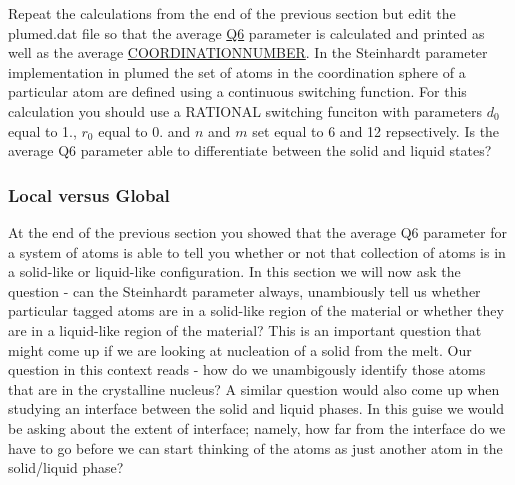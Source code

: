 Repeat the calculations from the end of the previous section but edit the plumed.\+dat file so that the average \hyperlink{Q6}{Q6} parameter is calculated and printed as well as the average \hyperlink{COORDINATIONNUMBER}{C\+O\+O\+R\+D\+I\+N\+A\+T\+I\+O\+N\+N\+U\+M\+B\+E\+R}. In the Steinhardt parameter implementation in plumed the set of atoms in the coordination sphere of a particular atom are defined using a continuous switching function. For this calculation you should use a R\+A\+T\+I\+O\+N\+A\+L switching funciton with parameters $d_0$ equal to 1., $r_0$ equal to 0. and $n$ and $m$ set equal to 6 and 12 repsectively. Is the average Q6 parameter able to differentiate between the solid and liquid states?\hypertarget{belfast-10_lvsg}{}\subsubsection{Local versus Global}\label{belfast-10_lvsg}
At the end of the previous section you showed that the average Q6 parameter for a system of atoms is able to tell you whether or not that collection of atoms is in a solid-\/like or liquid-\/like configuration. In this section we will now ask the question -\/ can the Steinhardt parameter always, unambiously tell us whether particular tagged atoms are in a solid-\/like region of the material or whether they are in a liquid-\/like region of the material? This is an important question that might come up if we are looking at nucleation of a solid from the melt. Our question in this context reads -\/ how do we unambigously identify those atoms that are in the crystalline nucleus? A similar question would also come up when studying an interface between the solid and liquid phases. In this guise we would be asking about the extent of interface; namely, how far from the interface do we have to go before we can start thinking of the atoms as just another atom in the solid/liquid phase?

